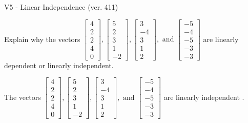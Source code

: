 \begin{exercise}
  \begin{exerciseTitle}V5 - Linear Independence (ver. 411)\end{exerciseTitle}
  \begin{exerciseStatement}
    Explain why the vectors \(\left[\begin{array}{r}
4 \\
2 \\
2 \\
4 \\
0
\end{array}\right] , \left[\begin{array}{r}
5 \\
2 \\
3 \\
1 \\
-2
\end{array}\right] , \left[\begin{array}{r}
3 \\
-4 \\
3 \\
1 \\
2
\end{array}\right] , \text{ and } \left[\begin{array}{r}
-5 \\
-4 \\
-5 \\
-3 \\
-3
\end{array}\right]\) are linearly dependent or linearly independent.	


  \end{exerciseStatement}
  \begin{exerciseAnswer}
   The vectors \(\left[\begin{array}{r}
4 \\
2 \\
2 \\
4 \\
0
\end{array}\right] , \left[\begin{array}{r}
5 \\
2 \\
3 \\
1 \\
-2
\end{array}\right] , \left[\begin{array}{r}
3 \\
-4 \\
3 \\
1 \\
2
\end{array}\right] , \text{ and } \left[\begin{array}{r}
-5 \\
-4 \\
-5 \\
-3 \\
-3
\end{array}\right]\) are 
  	 linearly independent  .
  


  \end{exerciseAnswer}
\end{exercise}